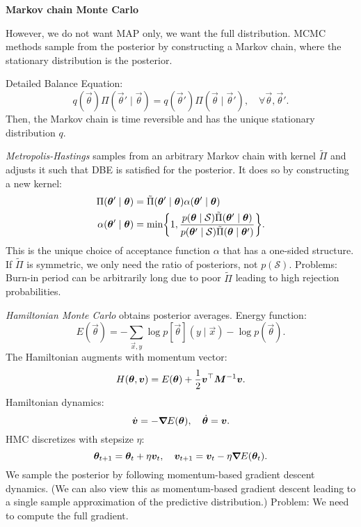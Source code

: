 \documentclass[10pt]{article}
\newenvironment{topic}[1]
{\textbf{\sffamily \colorbox{black}{\rlap{\textbf{\textcolor{white}{#1}}}\hspace{\linewidth}\hspace{-2\fboxsep}}}}
{}
\newenvironment{subtopic}[1]
{\begin{center}\textbf{\sffamily #1}\end{center}}
{}
\begin{document}
\begin{multicols*}{3}
\begin{topic}{Bayesian learning}
        \begin{subtopic}{Markov chain Monte Carlo}
            However, we do not want MAP only, we want the full distribution. MCMC methods sample from
            the posterior by constructing a Markov chain, where the stationary distribution is the
            posterior.

            Detailed Balance Equation: \[
                q(\vec{\theta}) \Pi(\vec{\theta}' \mid \vec{\theta}) = q(\vec{\theta}') \Pi(\vec{\theta} \mid \vec{\theta}'), \quad \forall \vec{\theta}, \vec{\theta}'.
            \]
            Then, the Markov chain is time reversible and has the unique stationary distribution $q$.

            \textit{Metropolis-Hastings} samples from an arbitrary Markov chain with kernel $\tilde{\Pi}$ and adjusts it
            such that DBE is satisfied for the posterior. It does so by constructing a new kernel:
            \begin{align*}
                \Pi(\vec{\theta}' \mid \vec{\theta})    & = \tilde{\Pi}(\vec{\theta}' \mid \vec{\theta}) \alpha(\vec{\theta}' \mid \vec{\theta})                                                                                                        \\
                \alpha(\vec{\theta}' \mid \vec{\theta}) & = \min \lft\{ 1, \frac{p(\vec{\theta} \mid \mathcal{S}) \tilde{\Pi}(\vec{\theta}' \mid \vec{\theta})}{p(\vec{\theta}' \mid \mathcal{S}) \tilde{\Pi}(\vec{\theta} \mid \vec{\theta}')} \rgt\}.
            \end{align*}
            This is the unique choice of acceptance function $\alpha$ that has a one-sided structure. If $\tilde{\Pi}$ is
            symmetric, we only need the ratio of posteriors, not $p(\mathcal{S})$. Problems: Burn-in
            period can be arbitrarily long due to poor $\tilde{\Pi}$ leading to high rejection
            probabilities.

            \textit{Hamiltonian Monte Carlo} obtains posterior averages. Energy function: \[
                E(\vec{\theta}) = - \sum_{\vec{x},y} \log p[\vec{\theta}](y \mid \vec{x}) - \log p(\vec{\theta}).
            \]
            The Hamiltonian augments with momentum vector: \[
                H(\bm{\theta}, \bm{v}) = E(\bm{\theta}) + \frac{1}{2} \bm{v}^\top \bm{M}^{-1} \bm{v}.
            \]
            Hamiltonian dynamics: \[
                \dot{\bm{v}} = -\bm{\nabla}_{\! } E(\bm{\theta}), \quad \dot{\bm{\theta}} = \bm{v}.
            \]
            HMC discretizes with stepsize $\eta$: \[
                \bm{\theta}_{t+1} = \bm{\theta}_t + \eta \bm{v}_t, \quad \bm{v}_{t+1} = \bm{v}_t - \eta \bm{\nabla}_{\! } E(\bm{\theta}_t).
            \]
            We sample the posterior by following momentum-based gradient descent dynamics. (We can also view
            this as momentum-based gradient descent leading to a single sample approximation of the predictive
            distribution.) Problem: We need to compute the full gradient.


\end{subtopic}
\end{topic}
\end{multicols*}
\end{document}

